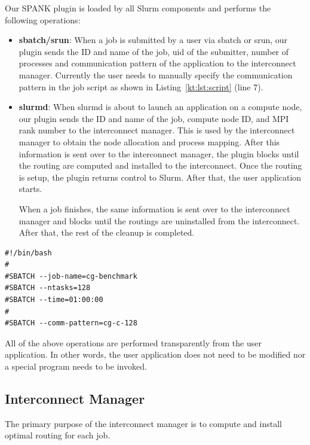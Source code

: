 \documentclass[graybox]{svmult}
\begin{document}
Our SPANK plugin is loaded by all Slurm components and performs the
following operations:

\begin{itemize}
    \item \textbf{sbatch/srun}: When a job is submitted by a user via sbatch
        or srun, our plugin sends the ID and name of the job, uid of the
        submitter, number of processes and communication pattern of the
        application to the interconnect manager. Currently the user
        needs to manually specify the communication pattern in the job script
        as shown in Listing~\ref{kt:lst:script} (line 7).
    \item \textbf{slurmd}: When slurmd is about to launch an application on a
        compute node, our plugin sends the ID and name of the job, compute
        node ID, and MPI rank number to the interconnect manager. This is used
        by the interconnect manager to obtain the node allocation and process
        mapping. After this information is sent over to the interconnect
        manager, the plugin blocks until the routing are computed and
        installed to the interconnect. Once the routing is setup, the plugin
        returns control to Slurm. After that, the user application starts.

        When a job finishes, the same information is sent over to the
        interconnect manager and blocks until the routings are uninstalled
        from the interconnect. After that, the rest of the cleanup is
        completed.
\end{itemize}

\begin{lstlisting}[float,caption=An example of a job script,label=kt:lst:script]
#!/bin/bash
#
#SBATCH --job-name=cg-benchmark
#SBATCH --ntasks=128
#SBATCH --time=01:00:00
#
#SBATCH --comm-pattern=cg-c-128
\end{lstlisting}

All of the above operations are performed transparently from the user
application. In other words, the user application does not need to be modified
nor a special program needs to be invoked.

\subsection{Interconnect Manager}

The primary purpose of the interconnect manager is to compute and install
optimal routing for each job.
\end{document}
